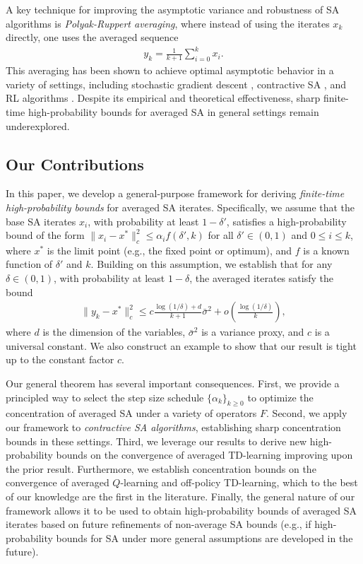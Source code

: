 \documentclass[letterpaper, 10 pt]{article}
\begin{document}
A key technique for improving the asymptotic variance and robustness of SA algorithms is \emph{Polyak-Ruppert averaging}, where instead of using the iterates $x_k$ directly, one uses the averaged sequence 
\begin{align}\label{eq:Polyak_rec}
    y_k = \frac{1}{k+1} \sum_{i=0}^k x_i.
\end{align}
This averaging has been shown to achieve optimal asymptotic behavior in a variety of settings, including stochastic gradient descent \cite{polyak1992acceleration, moulines2011non, bach2013non}, contractive SA \cite{chandak2025finite}, and RL algorithms \cite{mou2020linear, li2023polyak}. Despite its empirical and theoretical effectiveness, sharp finite-time high-probability bounds for averaged SA in general settings remain underexplored. 

\subsection{Our Contributions}

In this paper, we develop a general-purpose framework for deriving \emph{finite-time high-probability bounds} for averaged SA iterates. Specifically, we assume that the base SA iterates $x_i$, with probability at least $1-\delta'$, satisfies a high-probability bound of the form $\|x_i - x^*\|_c^2 \leq \alpha_i f(\delta',k)$ for all $\delta'\in(0,1)$ and $0\leq i\leq k$, where $x^*$ is the limit point (e.g., the fixed point or optimum), and $f$ is a known function of $\delta '$ and $k$. Building on this assumption, we establish that for any $\delta\in(0,1)$, with probability at least $1-\delta$, the averaged iterates satisfy the bound
\begin{align*}
    \|y_k - x^*\|_c^2 \leq c \frac{\log(1/\delta) + d}{k+1} \bar{\sigma}^2 + o\left(\frac{\log(1/\delta)}{k}\right),
\end{align*}
where $d$ is the dimension of the variables, $\bar{\sigma}^2$ is a variance proxy, and $c$ is a universal constant. We also construct an example to show that our result is tight up to the constant factor $c$.

Our general theorem has several important consequences. First, we provide a principled way to select the step size schedule $\{\alpha_k\}_{k\geq 0}$ to optimize the concentration of averaged SA under a variety of operators $F$. Second, we apply our framework to \emph{contractive SA algorithms}, establishing sharp concentration bounds in these settings. Third, we leverage our results to derive new high-probability bounds on the convergence of averaged TD-learning improving upon the prior result. Furthermore, we establish concentration bounds on the convergence of averaged $Q$-learning and off-policy TD-learning, which to the best of our knowledge are the first in the literature. Finally, the general nature of our framework allows it to be used to obtain high-probability bounds of averaged SA iterates based on future refinements of non-average SA bounds (e.g., if high-probability bounds for SA under more general assumptions are developed in the future).
\end{document}
